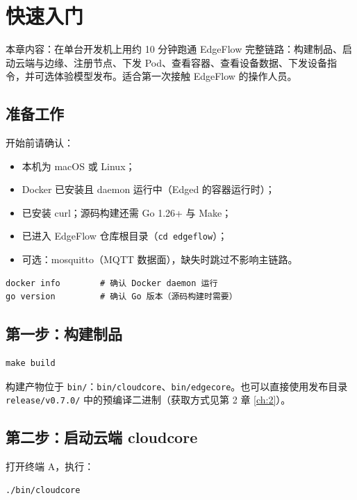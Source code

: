 \chapter{快速入门}
\label{ch:3}

本章内容：在单台开发机上用约 10 分钟跑通 EdgeFlow 完整链路：构建制品、启动云端与边缘、注册节点、下发 Pod、查看容器、查看设备数据、下发设备指令，并可选体验模型发布。适合第一次接触 EdgeFlow 的操作人员。

\section{准备工作}

开始前请确认：

\begin{itemize}
  \item 本机为 macOS 或 Linux；
  \item Docker 已安装且 daemon 运行中（Edged 的容器运行时）；
  \item 已安装 curl；源码构建还需 Go 1.26+ 与 Make；
  \item 已进入 EdgeFlow 仓库根目录（\texttt{cd edgeflow}）；
  \item 可选：mosquitto（MQTT 数据面），缺失时跳过不影响主链路。
\end{itemize}

\begin{lstlisting}
docker info        # 确认 Docker daemon 运行
go version         # 确认 Go 版本（源码构建时需要）
\end{lstlisting}

\section{第一步：构建制品}

\begin{lstlisting}
make build
\end{lstlisting}

构建产物位于 \texttt{bin/}：\texttt{bin/cloudcore}、\texttt{bin/edgecore}。也可以直接使用发布目录 \texttt{release/v0.7.0/} 中的预编译二进制（获取方式见第 2 章 \autoref{ch:2}）。

\section{第二步：启动云端 cloudcore}

打开终端 A，执行：

\begin{lstlisting}
./bin/cloudcore
\end{lstlisting}

